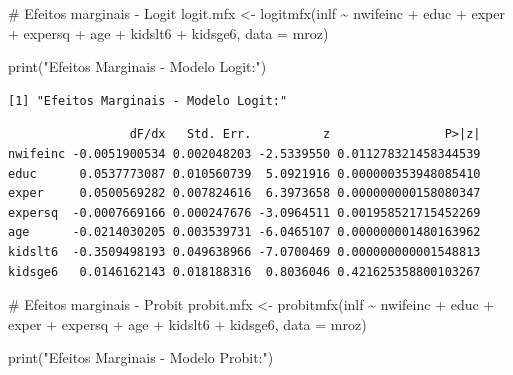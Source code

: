 \documentclass[
  letterpaper,
  DIV=11,
  numbers=noendperiod]{scrartcl}
\newenvironment{Shaded}{\begin{snugshade}}{\end{snugshade}}
\newcommand{\AttributeTok}[1]{\textcolor[rgb]{0.40,0.45,0.13}{#1}}
\newcommand{\CommentTok}[1]{\textcolor[rgb]{0.37,0.37,0.37}{#1}}
\newcommand{\FunctionTok}[1]{\textcolor[rgb]{0.28,0.35,0.67}{#1}}
\newcommand{\NormalTok}[1]{\textcolor[rgb]{0.00,0.23,0.31}{#1}}
\newcommand{\OtherTok}[1]{\textcolor[rgb]{0.00,0.23,0.31}{#1}}
\newcommand{\SpecialCharTok}[1]{\textcolor[rgb]{0.37,0.37,0.37}{#1}}
\newcommand{\StringTok}[1]{\textcolor[rgb]{0.13,0.47,0.30}{#1}}
\begin{document}
\begin{Shaded}
\begin{Highlighting}[]
\CommentTok{\# Efeitos marginais {-} Logit}
\NormalTok{logit.mfx }\OtherTok{\textless{}{-}} \FunctionTok{logitmfx}\NormalTok{(inlf }\SpecialCharTok{\textasciitilde{}}\NormalTok{ nwifeinc }\SpecialCharTok{+}\NormalTok{ educ }\SpecialCharTok{+}\NormalTok{ exper }\SpecialCharTok{+}\NormalTok{ expersq }\SpecialCharTok{+}\NormalTok{ age }\SpecialCharTok{+}\NormalTok{ kidslt6 }\SpecialCharTok{+}\NormalTok{ kidsge6,}
                      \AttributeTok{data =}\NormalTok{ mroz)}

\FunctionTok{print}\NormalTok{(}\StringTok{"Efeitos Marginais {-} Modelo Logit:"}\NormalTok{)}
\end{Highlighting}
\end{Shaded}

\begin{verbatim}
[1] "Efeitos Marginais - Modelo Logit:"
\end{verbatim}

\begin{Shaded}
\end{Shaded}

\begin{verbatim}
                 dF/dx   Std. Err.          z                P>|z|
nwifeinc -0.0051900534 0.002048203 -2.5339550 0.011278321458344539
educ      0.0537773087 0.010560739  5.0921916 0.000000353948085410
exper     0.0500569282 0.007824616  6.3973658 0.000000000158080347
expersq  -0.0007669166 0.000247676 -3.0964511 0.001958521715452269
age      -0.0214030205 0.003539731 -6.0465107 0.000000001480163962
kidslt6  -0.3509498193 0.049638966 -7.0700469 0.000000000001548813
kidsge6   0.0146162143 0.018188316  0.8036046 0.421625358800103267
\end{verbatim}

\begin{Shaded}
\begin{Highlighting}[]
\CommentTok{\# Efeitos marginais {-} Probit}
\NormalTok{probit.mfx }\OtherTok{\textless{}{-}} \FunctionTok{probitmfx}\NormalTok{(inlf }\SpecialCharTok{\textasciitilde{}}\NormalTok{ nwifeinc }\SpecialCharTok{+}\NormalTok{ educ }\SpecialCharTok{+}\NormalTok{ exper }\SpecialCharTok{+}\NormalTok{ expersq }\SpecialCharTok{+}\NormalTok{ age }\SpecialCharTok{+}\NormalTok{ kidslt6 }\SpecialCharTok{+}\NormalTok{ kidsge6,}
                        \AttributeTok{data =}\NormalTok{ mroz)}

\FunctionTok{print}\NormalTok{(}\StringTok{"Efeitos Marginais {-} Modelo Probit:"}\NormalTok{)}
\end{Highlighting}
\end{Shaded}
\end{document}
